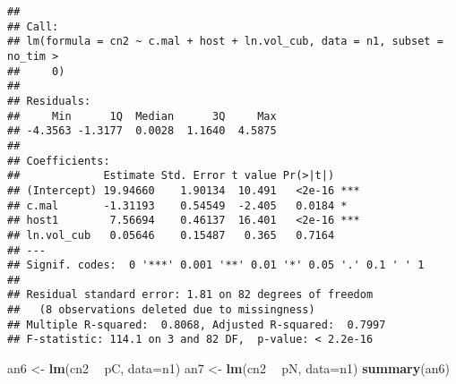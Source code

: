\documentclass[]{article}
\newenvironment{Shaded}{\begin{snugshade}}{\end{snugshade}}
\newcommand{\KeywordTok}[1]{\textcolor[rgb]{0.13,0.29,0.53}{\textbf{#1}}}
\newcommand{\DataTypeTok}[1]{\textcolor[rgb]{0.13,0.29,0.53}{#1}}
\newcommand{\DecValTok}[1]{\textcolor[rgb]{0.00,0.00,0.81}{#1}}
\newcommand{\FloatTok}[1]{\textcolor[rgb]{0.00,0.00,0.81}{#1}}
\newcommand{\StringTok}[1]{\textcolor[rgb]{0.31,0.60,0.02}{#1}}
\newcommand{\OperatorTok}[1]{\textcolor[rgb]{0.81,0.36,0.00}{\textbf{#1}}}
\newcommand{\NormalTok}[1]{#1}
\begin{document}
\begin{Shaded}
\end{Shaded}

\begin{verbatim}
## 
## Call:
## lm(formula = cn2 ~ c.mal + host + ln.vol_cub, data = n1, subset = no_tim > 
##     0)
## 
## Residuals:
##     Min      1Q  Median      3Q     Max 
## -4.3563 -1.3177  0.0028  1.1640  4.5875 
## 
## Coefficients:
##             Estimate Std. Error t value Pr(>|t|)    
## (Intercept) 19.94660    1.90134  10.491   <2e-16 ***
## c.mal       -1.31193    0.54549  -2.405   0.0184 *  
## host1        7.56694    0.46137  16.401   <2e-16 ***
## ln.vol_cub   0.05646    0.15487   0.365   0.7164    
## ---
## Signif. codes:  0 '***' 0.001 '**' 0.01 '*' 0.05 '.' 0.1 ' ' 1
## 
## Residual standard error: 1.81 on 82 degrees of freedom
##   (8 observations deleted due to missingness)
## Multiple R-squared:  0.8068, Adjusted R-squared:  0.7997 
## F-statistic: 114.1 on 3 and 82 DF,  p-value: < 2.2e-16
\end{verbatim}

\begin{Shaded}
\begin{Highlighting}[]
\NormalTok{an6 <-}\StringTok{ }\KeywordTok{lm}\NormalTok{(cn2 }\OperatorTok{~}\StringTok{ }\NormalTok{pC, }\DataTypeTok{data=}\NormalTok{n1)}
\NormalTok{an7 <-}\StringTok{ }\KeywordTok{lm}\NormalTok{(cn2 }\OperatorTok{~}\StringTok{ }\NormalTok{pN, }\DataTypeTok{data=}\NormalTok{n1)}
\KeywordTok{summary}\NormalTok{(an6)}
\end{Highlighting}
\end{Shaded}
\end{document}
